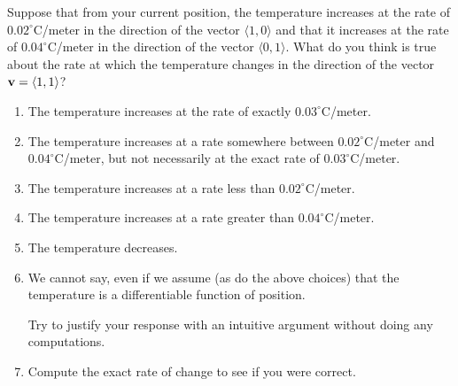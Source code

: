 \documentclass{ximera}
\begin{document}
\begin{question} \label{Qmer34}

Suppose that from your current position, the temperature increases at the rate of $0.02^\circ$C/meter in the direction of the vector $\langle 1, 0 \rangle$ and that it increases at the rate of $0.04^\circ$C/meter in the direction of the vector $\langle 0,1\rangle$. What do you think is true about the rate at which the temperature changes in the direction of the vector ${\bf v} = \langle 1,1\rangle$?

\begin{enumerate}

\item The temperature increases at the rate of exactly $0.03^\circ$C/meter.

\item The temperature increases at a rate somewhere between $0.02^\circ$C/meter and $0.04^\circ$C/meter, but not necessarily at the exact rate of $0.03^\circ$C/meter.

\item The temperature increases at a rate less than $0.02^\circ$C/meter.

\item The temperature increases at a rate greater than $0.04^\circ$C/meter.

\item The temperature decreases.

\item We cannot say, even if we assume (as do the above choices) that the temperature is a differentiable function of position.

Try to justify your response with an intuitive argument without doing any computations.
\begin{freeResponse}
\end{freeResponse}

\item Compute the exact rate of change to see if you were correct.
\end{enumerate}

\end{question}
\end{document}
